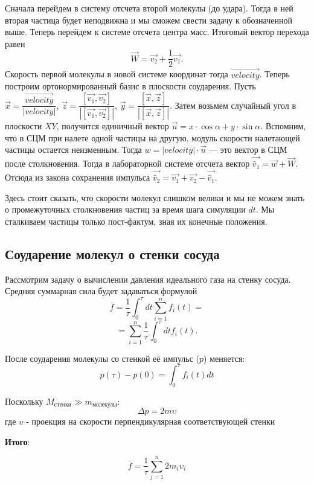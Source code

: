 \documentclass[twoside,twocolumn, 11pt]{article}
\theoremstyle{plain}
\theoremstyle{definition}
\begin{document}
Сначала перейдем в систему отсчета второй молекулы (до удара). Тогда в ней вторая частица будет неподвижна и мы сможем свести задачу к обозначенной выше. Теперь перейдем к системе отсчета центра масс. Итоговый вектор перехода равен
\begin{equation}
\vec{W} = \vec{v_2} + \dfrac{1}{2}\vec{v_1}.
\end{equation}
\indent Скорость первой молекулы в новой системе координат тогда $\vec{velocity}$.
Теперь построим ортонормированный базис в плоскости соударения. Пусть $\vec{x} = \dfrac{\vec{velocity}}{|velocity|}$, $\vec{z} = \dfrac{[\vec{v_1}, \vec{v_2}]}{|[\vec{v_1}, \vec{v_2}]|}$, $\vec{y} = \dfrac{[\vec{x}, \vec{z}]}{|[\vec{x}, \vec{z}]|}$. Затем возьмем случайный угол в плоскости $XY$, получится единичный вектор $\vec{u} = x \cdot \cos \alpha + y \cdot \sin \alpha$. Вспомним, что в СЦМ при налете одной частицы на другую, модуль скорости налетающей частицы остается неизменным. Тогда $w = |velocity| \cdot \vec{u}$ — это вектор в СЦМ после столкновения. Тогда в лабораторной системе отсчета вектор $\vec{\widetilde{v_1}} = \vec{w} + \vec{W}$. Отсюда из закона сохранения импульса $\vec{\widetilde{v_2}} = \vec{v_1} + \vec{v_2} - \vec{\widetilde{v_1}}$.

Здесь стоит сказать, что скорости молекул слишком велики и мы не можем знать о промежуточных столкновения частиц за время шага симуляции $dt$. Мы сталкиваем частицы только пост-фактум, зная их конечные положения.
\subsection{Соударение молекул о стенки сосуда}
Рассмотрим задачу о вычислении давления идеального газа на стенку сосуда. Средняя суммарная сила будет задаваться формулой
$$
\overline{f} = \dfrac{1}{\tau} \int_0^\tau dt \sum_{i=1}^n f_i(t) =$$
$$
= \sum_{i=1}^n \dfrac{1}{\tau} \int_0^\tau dt f_i(t).
$$

После соударения молекулы со стенкой её импульс ($p$) меняется:
\[p(\tau) - p(0) = \int_0^\tau f_i(t) dt \]

Поскольку $M_\text{стенки} \gg m_\text{молекулы}$:
\[\Delta p = 2m\upsilon \]где $\upsilon$ - проекция на скорости перпендикулярная соответствующей стенки

\textbf{Итого}:

\begin{equation}
\overline{f} = \dfrac{1}{\tau} \sum_{j=1}^n 2 m_i \upsilon_i
\end{equation}
\end{document}
